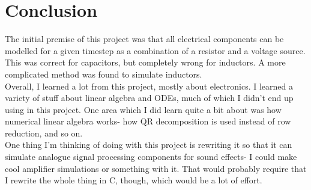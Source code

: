 \documentclass[11pt]{article}
\begin{document}
\section*{Conclusion}

The initial premise of this project was that all electrical components can be modelled for a given timestep as a combination of a resistor and a voltage source. This was correct for capacitors, but completely wrong for inductors. A more complicated method was found to simulate inductors.\\

Overall, I learned a lot from this project, mostly about electronics. I learned a variety of stuff about linear algebra and ODEs, much of which I didn't end up using in this project. One area which I did learn quite a bit about was how numerical linear algebra works- how QR decomposition is used instead of row reduction, and so on.\\

One thing I'm thinking of doing with this project is rewriting it so that it can simulate analogue signal processing components for sound effects- I could make cool amplifier simulations or something with it. That would probably require that I rewrite the whole thing in C, though, which would be a lot of effort.\\
\end{document}
